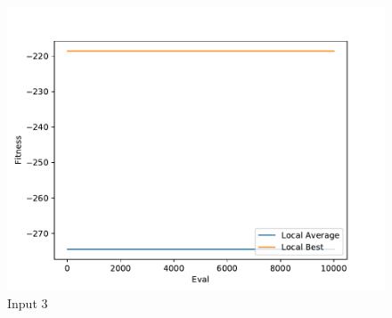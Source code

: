 \documentclass{standalone}
\begin{document}
\begin{figure}[!htb]
	\caption{Input 3}
	\label{fig:graph_3001}
	\includegraphics[width=\textwidth]{../graphs/graphs/3001.pdf}
\end{figure}
\end{document}
